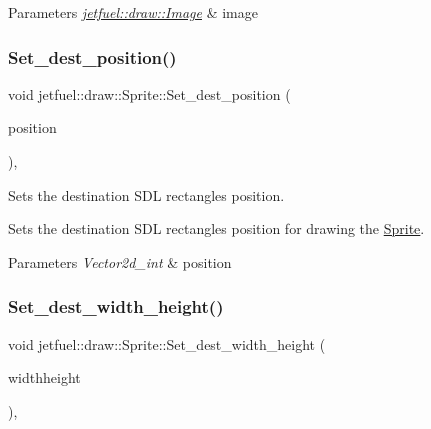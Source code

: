\begin{DoxyParams}{Parameters}
{\em \hyperlink{classjetfuel_1_1draw_1_1Image}{jetfuel\+::draw\+::\+Image}} & image \\
\hline
\end{DoxyParams}
\mbox{\label{classjetfuel_1_1draw_1_1Sprite_a58a61883d32073cd96d70c2cd6025534}} 
\subsubsection{\texorpdfstring{Set\+\_\+dest\+\_\+position()}{Set\_dest\_position()}}
{\footnotesize\ttfamily void jetfuel\+::draw\+::\+Sprite\+::\+Set\+\_\+dest\+\_\+position (\begin{DoxyParamCaption}\item[{const \hyperlink{classjetfuel_1_1draw_1_1Vector2d}{Vector2d\+\_\+int}}]{position }\end{DoxyParamCaption})\hspace{0.3cm}{\ttfamily [inline]}, {\ttfamily [protected]}}



Sets the destination S\+DL rectangle\textquotesingle{}s position. 

Sets the destination S\+DL rectangle\textquotesingle{}s position for drawing the \hyperlink{classjetfuel_1_1draw_1_1Sprite}{Sprite}.


\begin{DoxyParams}{Parameters}
{\em Vector2d\+\_\+int} & position \\
\hline
\end{DoxyParams}
\mbox{\label{classjetfuel_1_1draw_1_1Sprite_a089092a8511912f2b2c857ea111a29e6}} 
\subsubsection{\texorpdfstring{Set\+\_\+dest\+\_\+width\+\_\+height()}{Set\_dest\_width\_height()}}
{\footnotesize\ttfamily void jetfuel\+::draw\+::\+Sprite\+::\+Set\+\_\+dest\+\_\+width\+\_\+height (\begin{DoxyParamCaption}\item[{const \hyperlink{classjetfuel_1_1draw_1_1Vector2d}{Vector2d\+\_\+int}}]{widthheight }\end{DoxyParamCaption})\hspace{0.3cm}{\ttfamily [inline]}, {\ttfamily [protected]}}



